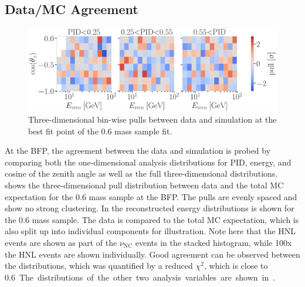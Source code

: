 \subsection{Data/MC Agreement} 

\begin{figure}[h]
    \includegraphics{figures/results/checks/bfp_3d_binwise_pull_0.6_GeV.pdf}
	\caption[Best fit three-dimensional bin-wise pulls (\SI{0.6}{\gev})]{Three-dimensional bin-wise pulls between data and simulation at the best fit point of the \SI{0.6}{\gev} mass sample fit.}
\end{figure}

At the BFP, the agreement between the data and simulation is probed by comparing both the one-dimensional analysis distributions for PID, energy, and cosine of the zenith angle as well as the full three-dimensional distributions.  shows the three-dimensional pull distribution between data and the total MC expectation for the \SI{0.6}{\gev} mass sample at the BFP. The pulls are evenly spaced and show no strong clustering. In  the reconstructed energy distributions is shown for the \SI{0.6}{\gev} mass sample. The data is compared to the total MC expectation, which is also split up into individual components for illustration. Note here that the HNL events are shown as part of the $\nu_\mathrm{NC}$ events in the stacked histogram, while 100x the HNL events are shown individually. Good agreement can be observed between the distributions, which was quantified by a reduced $\chi^2$, which is close to \SI{0.6}. The distributions of the other two analysis variables are shown in . 

